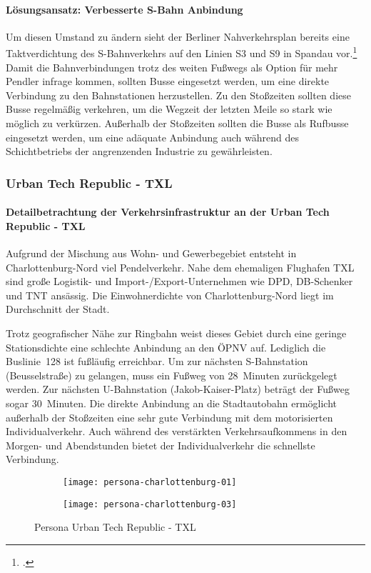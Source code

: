 \paragraph{Lösungsansatz: Verbesserte S-Bahn Anbindung}
Um diesen Umstand zu ändern sieht der Berliner Nahverkehrsplan bereits eine Taktverdichtung des S-Bahnverkehrs auf den Linien S3 und S9 in Spandau vor.\footcite{NahverkehrsplanBerlin} Damit die Bahnverbindungen trotz des weiten Fußwegs als Option für mehr Pendler infrage kommen, sollten Busse eingesetzt werden, um eine direkte Verbindung zu den Bahnstationen herzustellen. Zu den Stoßzeiten sollten diese Busse regelmäßig verkehren, um die Wegzeit der letzten Meile so stark wie möglich zu verkürzen. Außerhalb der Stoßzeiten sollten die Busse als Rufbusse eingesetzt werden, um eine adäquate Anbindung auch während des Schichtbetriebs der angrenzenden Industrie zu gewährleisten.

\subsubsection{Urban Tech Republic - TXL}
\paragraph{Detailbetrachtung der Verkehrsinfrastruktur an der Urban Tech Republic - TXL}
Aufgrund der Mischung aus Wohn- und Gewerbegebiet entsteht in Charlottenburg-Nord viel Pendelverkehr. Nahe dem ehemaligen Flughafen TXL sind große Logistik- und Import-/Export-Unternehmen wie DPD, DB-Schenker und TNT ansässig. Die Einwohnerdichte von Charlottenburg-Nord liegt im Durchschnitt der Stadt.

Trotz geografischer Nähe zur Ringbahn weist dieses Gebiet durch eine geringe Stationsdichte eine schlechte Anbindung an den ÖPNV auf. Lediglich die Buslinie~128 ist fußläufig erreichbar. Um zur nächsten S-Bahnstation (Beusselstraße) zu gelangen, muss ein Fußweg von 28~Minuten zurückgelegt werden. Zur nächsten U-Bahnstation (Jakob-Kaiser-Platz) beträgt der Fußweg sogar 30~Minuten. Die direkte Anbindung an die Stadtautobahn ermöglicht außerhalb der Stoßzeiten eine sehr gute Verbindung mit dem motorisierten Individualverkehr. Auch während des verstärkten Verkehrsaufkommens in den Morgen- und Abendstunden bietet der Individualverkehr die schnellste Verbindung.

\begin{figure}
    \centering
    \begin{subfigure}{.5\textwidth}
        \centering
        \texttt{[image: persona-charlottenburg-01]}
    \end{subfigure}%
    \begin{subfigure}{.5\textwidth}
        \centering
        \texttt{[image: persona-charlottenburg-03]}
    \end{subfigure}
    \caption{Persona Urban Tech Republic - TXL}
    \label{persona-charlottenburg-nord}
\end{figure}

